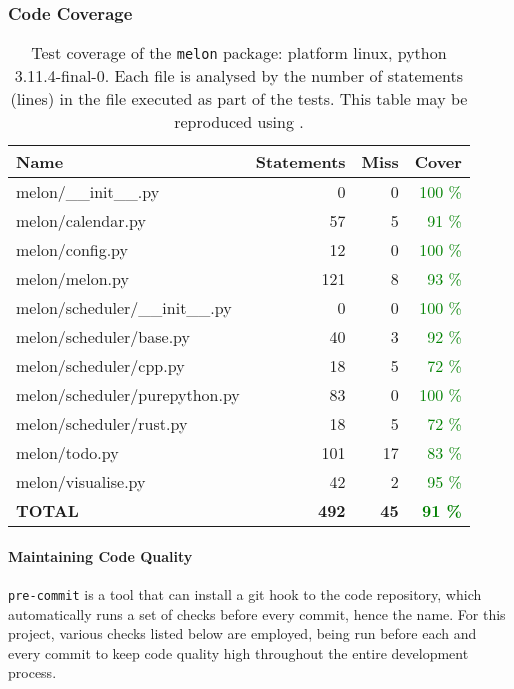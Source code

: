 \subsubsection{Code Coverage}
\begin{table}
  \centering
  \caption{Test coverage of the \texttt{melon} package: platform linux, python 3.11.4-final-0. Each file is analysed by the number of statements (lines) in the file executed as part of the tests. This table may be reproduced using .}
  \begin{tabular}{lrrr}
    \hline
    \bf Name                        & \bf Statements & \bf Miss & \bf Cover                    \\
    \hline
    melon/\_\_init\_\_.py           & 0              & 0        & \textcolor{green}{100 \%}    \\
    melon/calendar.py               & 57             & 5        & \textcolor{green}{91 \%}     \\
    melon/config.py                 & 12             & 0        & \textcolor{green}{100 \%}    \\
    melon/melon.py                  & 121            & 8        & \textcolor{green}{93 \%}     \\
    melon/scheduler/\_\_init\_\_.py & 0              & 0        & \textcolor{green}{100 \%}    \\
    melon/scheduler/base.py         & 40             & 3        & \textcolor{green}{92 \%}     \\
    melon/scheduler/cpp.py          & 18             & 5        & \textcolor{green}{72 \%}     \\
    melon/scheduler/purepython.py   & 83             & 0        & \textcolor{green}{100 \%}    \\
    melon/scheduler/rust.py         & 18             & 5        & \textcolor{green}{72 \%}     \\
    melon/todo.py                   & 101            & 17       & \textcolor{green}{83 \%}     \\
    melon/visualise.py              & 42             & 2        & \textcolor{green}{95 \%}     \\
    \hline
    \bf TOTAL                       & \bf 492        & \bf 45   & \bf \textcolor{green}{91 \%}
  \end{tabular}
\end{table}

\paragraph{Maintaining Code Quality}
\texttt{pre-commit} is a tool that can install a git hook to the code repository, which automatically runs a set of checks before every commit, hence the name.
For this project, various checks listed below are employed, being run before each and every commit to keep code quality high throughout the entire development process.

